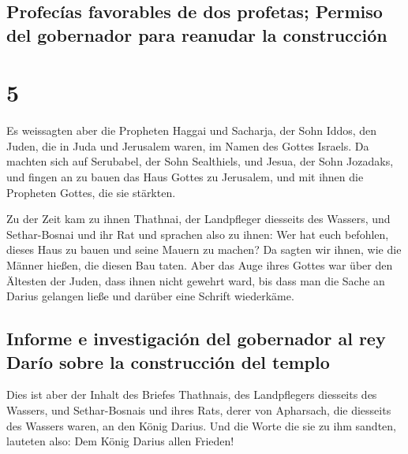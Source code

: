 \hypertarget{profecuxedas-favorables-de-dos-profetas-permiso-del-gobernador-para-reanudar-la-construcciuxf3n}{%
\subsection{Profecías favorables de dos profetas; Permiso del gobernador
para reanudar la
construcción}\label{profecuxedas-favorables-de-dos-profetas-permiso-del-gobernador-para-reanudar-la-construcciuxf3n}}

\hypertarget{section-4}{%
\section{5}\label{section-4}}

 Es weissagten aber die Propheten Haggai und Sacharja, der
Sohn Iddos, den Juden, die in Juda und Jerusalem waren, im Namen des
Gottes Israels.  Da machten sich auf Serubabel, der Sohn
Sealthiels, und Jesua, der Sohn Jozadaks, und fingen an zu bauen das
Haus Gottes zu Jerusalem, und mit ihnen die Propheten Gottes, die sie
stärkten.

 Zu der Zeit kam zu ihnen Thathnai, der Landpfleger
diesseits des Wassers, und Sethar-Bosnai und ihr Rat und sprachen also
zu ihnen: Wer hat euch befohlen, dieses Haus zu bauen und seine Mauern
zu machen?  Da sagten wir ihnen, wie die Männer hießen,
die diesen Bau taten.  Aber das Auge ihres Gottes war über
den Ältesten der Juden, dass ihnen nicht gewehrt ward, bis dass man die
Sache an Darius gelangen ließe und darüber eine Schrift wiederkäme.

\hypertarget{informe-e-investigaciuxf3n-del-gobernador-al-rey-daruxedo-sobre-la-construcciuxf3n-del-templo}{%
\subsection{Informe e investigación del gobernador al rey Darío sobre la
construcción del
templo}\label{informe-e-investigaciuxf3n-del-gobernador-al-rey-daruxedo-sobre-la-construcciuxf3n-del-templo}}

 Dies ist aber der Inhalt des Briefes Thathnais, des
Landpflegers diesseits des Wassers, und Sethar-Bosnais und ihres Rats,
derer von Apharsach, die diesseits des Wassers waren, an den König
Darius.  Und die Worte die sie zu ihm sandten, lauteten
also: Dem König Darius allen Frieden!

